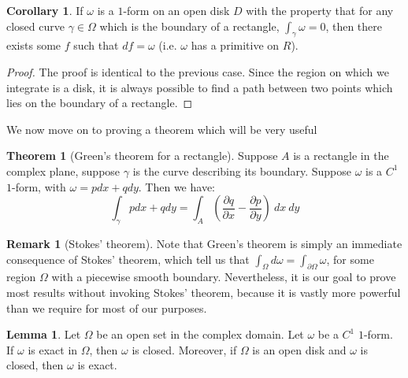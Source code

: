\documentclass[aps,pra,showpacs,notitlepage,onecolumn,superscriptaddress,nofootinbib]{revtex4-1}
\theoremstyle{definition}
\newtheorem{lemma}{Lemma}[section]
\newtheorem{theorem}{Theorem}[section]
\newtheorem{corollary}{Corollary}[theorem]
\newtheorem{remark}{Remark}[section]
\begin{document}
\begin{corollary}
  \label{cor:rect}
  If $\omega$ is a $1$-form on an open disk $D$ with the property that for any closed curve $\gamma \in \Omega$ which is the boundary of a rectangle, $\int_{\gamma} \omega = 0$,
  then there exists some $f$ such that $df = \omega$ (i.e. $\omega$ has a primitive on $R$).
\end{corollary}

\begin{proof}
  The proof is identical to the previous case. Since the region on which we integrate is a disk, it is always possible to find a path between two points which lies on the
  boundary of a rectangle.
  \end{proof}

\noindent We now move on to proving a theorem which will be very useful

\begin{theorem}[Green's theorem for a rectangle]
  Suppose $A$ is a rectangle in the complex plane, suppose $\gamma$ is the curve describing its boundary. Suppose $\omega$ is a $C^1$
  $1$-form, with $\omega = p dx + q dy$. Then we have:
  \begin{equation}
    \displaystyle\int_{\gamma} p dx + q dy = \displaystyle\int_{A} \left( \frac{\partial q}{\partial x} - \frac{\partial p}{\partial y} \right) \ dx \ dy
    \end{equation}
\end{theorem}

\begin{remark}[Stokes' theorem]
  Note that Green's theorem is simply an immediate consequence of Stokes' theorem, which tell us that $\int_{\Omega} d\omega = \int_{\partial \Omega} \omega$, for some region $\Omega$ with a piecewise
  smooth boundary. Nevertheless, it is our goal to prove most results without invoking Stokes' theorem, because it is vastly more powerful than we require for most of our purposes.
  \end{remark}

\begin{lemma}
  Let $\Omega$ be an open set in the complex domain. Let $\omega$ be a $C^{1}$ $1$-form. If $\omega$ is exact in $\Omega$, then $\omega$ is closed.
  Moreover, if $\Omega$ is an open disk and $\omega$ is closed, then $\omega$ is exact.
\end{lemma}
\end{document}
